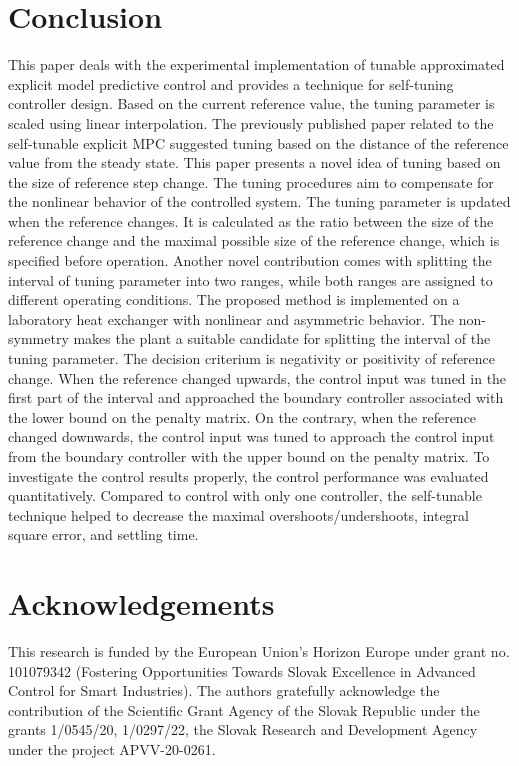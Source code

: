 \documentclass[preprint,12pt]{elsarticle}
\begin{document}
\section{Conclusion}
\label{sec:conclusion}
This paper deals with the experimental implementation of tunable approximated explicit model predictive control and provides a technique for self-tuning controller design. Based on the current reference value, the tuning parameter is scaled using linear interpolation. The previously published paper related to the self-tunable explicit MPC suggested tuning based on the distance of the reference value from the steady state. This paper presents a novel idea of tuning based on the size of reference step change. The tuning procedures aim to compensate for the nonlinear behavior of the controlled system. The tuning parameter is updated when the reference changes. It is calculated as the ratio between the size of the reference change and the maximal possible size of the reference change, which is specified before operation. Another novel contribution comes with splitting the interval of tuning parameter into two ranges, while both ranges are assigned to different operating conditions. The proposed method is implemented on a laboratory heat exchanger with nonlinear and asymmetric behavior. The non-symmetry makes the plant a suitable candidate for splitting the interval of the tuning parameter. The decision criterium is negativity or positivity of reference change. When the reference changed upwards, the control input was tuned in the first part of the interval and approached the boundary controller associated with the lower bound on the penalty matrix. On the contrary, when the reference changed downwards, the control input was tuned to approach the control input from the boundary controller with the upper bound on the penalty matrix. To investigate the control results properly, the control performance was evaluated quantitatively. Compared to control with only one controller, the self-tunable technique helped to decrease the maximal overshoots/undershoots, integral square error, and settling time.

\section*{Acknowledgements}
This research is funded by the European Union’s Horizon Europe under grant no. 101079342 (Fostering Opportunities Towards Slovak Excellence in Advanced Control for Smart Industries). The authors gratefully acknowledge the contribution of the Scientific Grant Agency of the Slovak Republic under the grants 1/0545/20, 1/0297/22, the Slovak Research and Development Agency under the project APVV-20-0261. 
\end{document}
